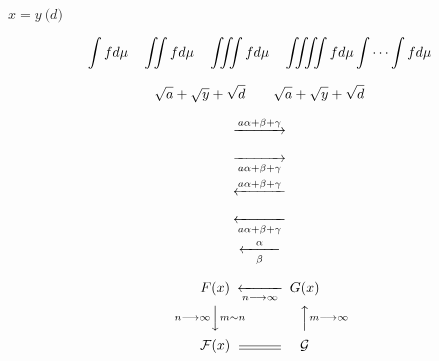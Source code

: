 \documentclass[11pt]{article}
\newcommand{\go}{\longrightarrow}
\begin{document}
$x=y \pod d$

\begin{equation}
\int f d\mu \quad
\iint f d\mu \quad
\iiint f d\mu \quad
\iiiint f d\mu \idotsint fd\mu
\end{equation}

$$\sqrt{a} + \sqrt{y} + \sqrt{d} \qquad
\sqrt{a} + \sqrt{\smash[b] y} + \sqrt{\smash[b] d}$$

\begin{eqnarray*}
\begin{CD}
@>a \alpha+\beta+\gamma>> \\
@>> a\alpha+\beta+\gamma > \\
@<a \alpha+\beta + \gamma << \\
@<< a \alpha+\beta+\gamma < \\
@< \alpha < \beta < \\
\end{CD}
\end{eqnarray*}

\begin{equation*}
\begin{CD}
F(x) @<< n \go \infty < G(x) \\
@V{n\go\infty}V{m \sim n}V	@AA m\go\infty A \\
\mathcal{F}(x) @=		\mathcal{G}
\end{CD}
\end{equation*}
\end{document}

